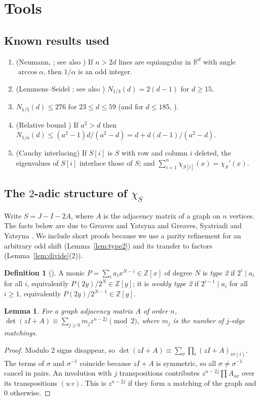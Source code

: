 \documentclass[11pt]{article}
\newtheorem{lemma}[theorem]{Lemma}
\theoremstyle{definition}
\newtheorem{definition}[theorem]{Definition}
\newcommand{\Z}{\mathbb{Z}}
\newcommand{\R}{\mathbb{R}}
\begin{document}
\section{Tools}

\subsection{Known results used}
\begin{enumerate}
\item[(K1)] (Neumann, \cite[Thm.~3.4]{LS73}; see also \cite[Thm.~1.2]{BY14}) If $n>2d$ lines are
equiangular in $\R^d$ with angle $\arccos\alpha$, then $1/\alpha$ is an odd integer.
\item[(K2)] (Lemmens--Seidel \cite[Thm.~4.5]{LS73}; see also \cite{KT19}) $N_{1/3}(d)=2(d-1)$ for
$d\ge15$.
\item[(K3)] $N_{1/5}(d)\le276$ for $23\le d\le59$ \cite[Thm.~1.1]{Yu17} (and for $d\le185$,
\cite{CKLY22}).
\item[(K4)] (Relative bound \cite{vLS66,LS73}) If $a^2>d$ then
$N_{1/a}(d)\le(a^2-1)d/(a^2-d)=d+d(d-1)/(a^2-d)$.
\item[(K5)] (Cauchy interlacing) If $S[i]$ is $S$ with row and column $i$ deleted, the eigenvalues of
$S[i]$ interlace those of $S$; and $\sum_{i=1}^n\chi_{S[i]}(x)=\chi_S'(x)$.
\end{enumerate}

\subsection{\texorpdfstring{The $2$-adic structure of $\chi_S$}{The 2-adic structure of chi\_S}}
Write $S=J-I-2A$, where $A$ is the adjacency matrix of a graph on $n$ vertices. The facts below are
due to Greaves and Yatsyna \cite[\S3]{GY19} and Greaves, Syatriadi and Yatsyna
\cite[Thm.~2.5, Lemmas~2.7, 2.8]{GSY21}. We include short proofs because we use a parity refinement
for an arbitrary odd shift (Lemma~\ref{lem:type2}) and its transfer to factors
(Lemma~\ref{lem:divide}(2)).

\begin{definition}[{\cite[Def.~2.6]{GSY21}}]
A monic $P=\sum_i a_ix^{N-i}\in\Z[x]$ of degree $N$ is \emph{type 2} if $2^i\mid a_i$ for all $i$,
equivalently $P(2y)/2^N\in\Z[y]$; it is \emph{weakly type 2} if $2^{i-1}\mid a_i$ for all $i\ge1$,
equivalently $P(2y)/2^{N-1}\in\Z[y]$.
\end{definition}

\begin{lemma}\label{lem:match}
For a graph adjacency matrix $A$ of order $n$, $\det(zI+A)\equiv\sum_{j\ge0}m_jz^{n-2j}\pmod 2$,
where $m_j$ is the number of $j$-edge matchings.
\end{lemma}
\begin{proof}
Modulo $2$ signs disappear, so $\det(zI+A)\equiv\sum_\sigma\prod_i(zI+A)_{i\sigma(i)}$. The terms of
$\sigma$ and $\sigma^{-1}$ coincide because $zI+A$ is symmetric, so all $\sigma\ne\sigma^{-1}$ cancel in
pairs. An involution with $j$ transpositions contributes $z^{n-2j}\prod A_{uv}$ over its
transpositions $(u\,v)$. This is $z^{n-2j}$ if they form a matching of the graph and $0$ otherwise.
\end{proof}
\end{document}
